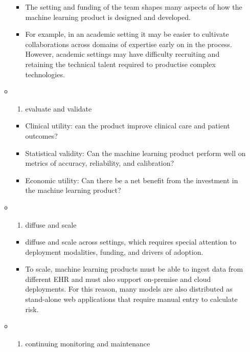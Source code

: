 \documentclass[
  man]{apa7}
\providecommand{\tightlist}{%
  \setlength{\itemsep}{0pt}\setlength{\parskip}{0pt}}
\begin{document}
\begin{itemize}
\begin{itemize}
    \begin{itemize}
    \tightlist
    \item
      The setting and funding of the team shapes many aspects of how the machine learning product is designed and developed.
    \item
      For example, in an academic setting it may be easier to cultivate collaborations across domains of expertise early on in the process. However, academic settings may have difficulty recruiting and retaining the technical talent required to productise complex technologies.
    \end{itemize}
  \item
    \begin{enumerate}
    \def\labelenumi{\arabic{enumi})}
    \setcounter{enumi}{1}
    \tightlist
    \item
      evaluate and validate
    \end{enumerate}

    \begin{itemize}
    \tightlist
    \item
      Clinical utility: can the product improve clinical care and patient outcomes?
    \item
      Statistical validity: Can the machine learning product perform well on metrics of accuracy, reliability, and calibration?
    \item
      Economic utility: Can there be a net benefit from the investment in the machine learning product?
    \end{itemize}
  \item
    \begin{enumerate}
    \def\labelenumi{\arabic{enumi})}
    \setcounter{enumi}{2}
    \tightlist
    \item
      diffuse and scale
    \end{enumerate}

    \begin{itemize}
    \tightlist
    \item
      diffuse and scale across settings, which requires special attention to deployment modalities, funding, and drivers of adoption.
    \item
      To scale, machine learning products must be able to ingest data from different EHR and must also support on-premise and cloud deployments. For this reason, many models are also distributed as stand-alone web applications that require manual entry to calculate risk.
    \end{itemize}
  \item
    \begin{enumerate}
    \def\labelenumi{\arabic{enumi})}
    \setcounter{enumi}{3}
    \tightlist
    \item
      continuing monitoring and maintenance
    \end{enumerate}


\end{itemize}
\end{itemize}
\end{document}
